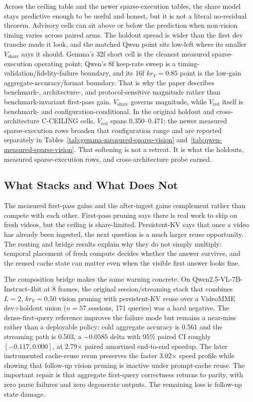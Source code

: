 Across the ceiling table and the newer sparse-execution tables, the share model stays predictive enough to
be useful and honest, but it is not a literal no-residual theorem. Advisory
cells can sit above or below the prediction when non-vision timing varies
across paired arms. The holdout spread is wider than
the first dev tranche made it look, and the matched Qwen point sits low-left
where its smaller \(V_{\mathrm{share}}\) says it should. Gemma's 32f short cell
is the cleanest measured sparse-execution operating point; Qwen's 8f keep-rate
sweep is a timing-validation/fidelity-failure boundary, and its 16f \(kr_V=0.85\)
point is the low-gain aggregate-accuracy/format boundary. That is why the paper describes
benchmark-, architecture-, and protocol-sensitive magnitude rather than
benchmark-invariant first-pass gain. \(V_{\mathrm{share}}\) governs magnitude,
while \(V_{\mathrm{red}}\) itself is benchmark- and configuration-conditional.
In the original holdout and cross-architecture C-CEILING cells,
\(V_{\mathrm{red}}\) spans 0.350--0.471; the newer measured sparse-execution
rows broaden that configuration range and are reported separately in
Tables~\ref{tab:gemma-measured-sparse-vision}
and~\ref{tab:qwen-measured-sparse-vision}. That softening is not a retreat. It
is what the holdouts, measured sparse-execution rows, and cross-architecture
probe earned.

\subsection{What Stacks and What Does Not}

The measured first-pass gains and the after-ingest gains complement rather than
compete with each other. First-pass pruning says there is real work to skip on
fresh videos, but the ceiling is share-limited. Persistent-KV says that once a
video has already been ingested, the next question is a much larger reuse
opportunity. The routing and bridge results explain why they do not simply
multiply: temporal placement of fresh compute decides whether the answer
survives, and the reused cache state can matter even when the visible first
answer looks fine.

The composition bridge makes the same warning concrete. On Qwen2.5-VL-7B-Instruct-4bit
at 8 frames, the original session/streaming stack that combines \(L=2\),
\(kr_V=0.50\) vision pruning with persistent-KV reuse over a VideoMME
dev+holdout union (\(n=57\) sessions, 171 queries) was a hard negative. The
dense-first-query reference improves the failure mode but remains a near-miss
rather than a deployable policy: cold aggregate accuracy is 0.561 and the streaming path
is 0.503, a \(-0.0585\) delta with 95\% paired CI roughly \([-0.117, 0.000]\),
at 2.79$\times$ paired amortized end-to-end speedup. The later instrumented
cache-reuse rerun preserves the faster 3.02$\times$ speed profile while showing
that follow-up vision pruning is inactive under prompt-cache reuse. The
important repair is that aggregate first-query correctness returns to parity,
with zero parse failures and zero degenerate outputs. The remaining loss is
follow-up state damage.

